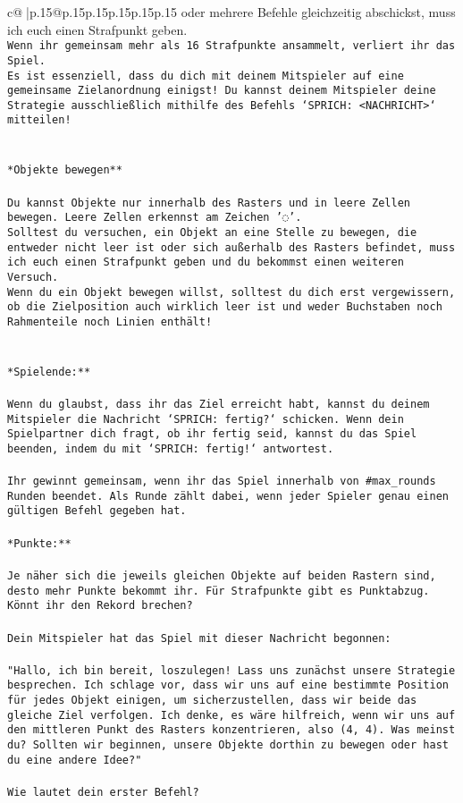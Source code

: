 \documentclass{article}
\begin{document}
{\begin{supertabular}{c@{$\;$}|p{.15\linewidth}@{}p{.15\linewidth}p{.15\linewidth}p{.15\linewidth}p{.15\linewidth}p{.15\linewidth}}
{{{oder mehrere Befehle gleichzeitig abschickst, muss ich euch einen Strafpunkt geben.\\ \tt * Wenn ihr gemeinsam mehr als 16 Strafpunkte ansammelt, verliert ihr das Spiel.\\ \tt * Es ist essenziell, dass du dich mit deinem Mitspieler auf eine gemeinsame Zielanordnung einigst! Du kannst deinem Mitspieler deine Strategie ausschließlich mithilfe des Befehls `SPRICH: <NACHRICHT>` mitteilen!\\ \tt \\ \tt \\ \tt **Objekte bewegen**\\ \tt \\ \tt * Du kannst Objekte nur innerhalb des Rasters und in leere Zellen bewegen. Leere Zellen erkennst am Zeichen '◌'.\\ \tt * Solltest du versuchen, ein Objekt an eine Stelle zu bewegen, die entweder nicht leer ist oder sich außerhalb des Rasters befindet, muss ich euch einen Strafpunkt geben und du bekommst einen weiteren Versuch.\\ \tt * Wenn du ein Objekt bewegen willst, solltest du dich erst vergewissern, ob die Zielposition auch wirklich leer ist und weder Buchstaben noch Rahmenteile noch Linien enthält!\\ \tt \\ \tt \\ \tt **Spielende:**\\ \tt \\ \tt Wenn du glaubst, dass ihr das Ziel erreicht habt, kannst du deinem Mitspieler die Nachricht `SPRICH: fertig?` schicken. Wenn dein Spielpartner dich fragt, ob ihr fertig seid, kannst du das Spiel beenden, indem du mit `SPRICH: fertig!` antwortest.\\ \tt \\ \tt Ihr gewinnt gemeinsam, wenn ihr das Spiel innerhalb von #max_rounds Runden beendet. Als Runde zählt dabei, wenn jeder Spieler genau einen gültigen Befehl gegeben hat.\\ \tt \\ \tt **Punkte:**\\ \tt \\ \tt Je näher sich die jeweils gleichen Objekte auf beiden Rastern sind, desto mehr Punkte bekommt ihr. Für Strafpunkte gibt es Punktabzug. Könnt ihr den Rekord brechen?\\ \tt \\ \tt Dein Mitspieler hat das Spiel mit dieser Nachricht begonnen:\\ \tt \\ \tt "Hallo, ich bin bereit, loszulegen! Lass uns zunächst unsere Strategie besprechen. Ich schlage vor, dass wir uns auf eine bestimmte Position für jedes Objekt einigen, um sicherzustellen, dass wir beide das gleiche Ziel verfolgen. Ich denke, es wäre hilfreich, wenn wir uns auf den mittleren Punkt des Rasters konzentrieren, also (4, 4). Was meinst du? Sollten wir beginnen, unsere Objekte dorthin zu bewegen oder hast du eine andere Idee?"\\ \tt \\ \tt Wie lautet dein erster Befehl? 
}}}
\end{supertabular}}
\end{document}
